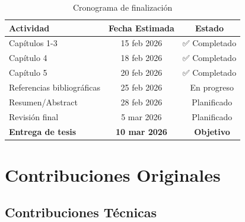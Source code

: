 \documentclass[12pt,a4paper]{article}
\begin{document}
\begin{table}[H]
\centering
\begin{tabular}{lcc}
\toprule
\textbf{Actividad} & \textbf{Fecha Estimada} & \textbf{Estado} \\
\midrule
Capítulos 1-3 & 15 feb 2026 & ✅ Completado \\
Capítulo 4 & 18 feb 2026 & ✅ Completado \\
Capítulo 5 & 20 feb 2026 & ✅ Completado \\
Referencias bibliográficas & 25 feb 2026 & 🔄 En progreso \\
Resumen/Abstract & 28 feb 2026 & 📅 Planificado \\
Revisión final & 5 mar 2026 & 📅 Planificado \\
\midrule
\textbf{Entrega de tesis} & \textbf{10 mar 2026} & \textbf{📅 Objetivo} \\
\bottomrule
\end{tabular}
\caption{Cronograma de finalización}
\end{table}

\section{Contribuciones Originales}

\subsection{Contribuciones Técnicas}
\end{document}
